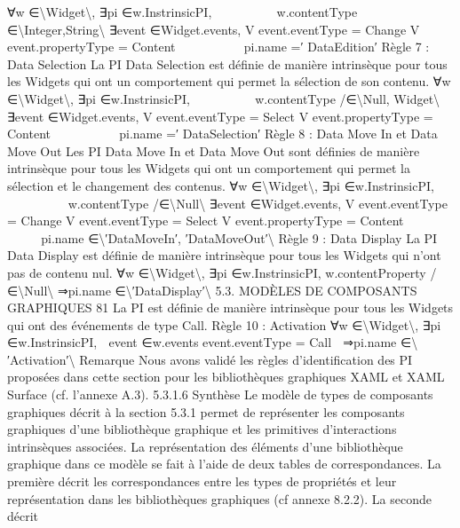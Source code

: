 \documentclass{article}
\begin{document}
∀w ∈\textbackslash{}{Widget\textbackslash{}}, ∃pi ∈w.InstrinsicPI,








w.contentType ∈\textbackslash{}{Integer,String\textbackslash{}}
∃event ∈Widget.events,
V
event.eventType = Change
V
event.propertyType = Content








⇒pi.name =′ DataEdition′
R\`{e}gle 7 : Data Selection
La PI Data Selection est d\'{e}ﬁnie de mani\`{e}re intrins\`{e}que pour tous les Widgets qui ont un comportement qui permet la s\'{e}lection de son contenu.
∀w ∈\textbackslash{}{Widget\textbackslash{}}, ∃pi ∈w.InstrinsicPI,








w.contentType /∈\textbackslash{}{Null, Widget\textbackslash{}}
∃event ∈Widget.events,
V
event.eventType = Select
V
event.propertyType = Content








⇒pi.name =′ DataSelection′
R\`{e}gle 8 : Data Move In et Data Move Out
Les PI Data Move In et Data Move Out sont d\'{e}ﬁnies de mani\`{e}re intrins\`{e}que pour tous les Widgets
qui ont un comportement qui permet la s\'{e}lection et le changement des contenus.
∀w ∈\textbackslash{}{Widget\textbackslash{}}, ∃pi ∈w.InstrinsicPI,










w.contentType /∈\textbackslash{}{Null\textbackslash{}}
∃event ∈Widget.events,
V
event.eventType = Change
V
event.eventType = Select V
event.propertyType = Content










⇒pi.name ∈\textbackslash{}{′DataMoveIn′, ′DataMoveOut′\textbackslash{}}
R\`{e}gle 9 : Data Display
La PI Data Display est d\'{e}ﬁnie de mani\`{e}re intrins\`{e}que pour tous les Widgets qui n’ont pas de
contenu nul.
∀w ∈\textbackslash{}{Widget\textbackslash{}}, ∃pi ∈w.InstrinsicPI,
w.contentProperty /∈\textbackslash{}{Null\textbackslash{}} ⇒pi.name ∈\textbackslash{}{′DataDisplay′\textbackslash{}}
5.3. MODÈLES DE COMPOSANTS GRAPHIQUES
81
La PI est d\'{e}ﬁnie de mani\`{e}re intrins\`{e}que pour tous les Widgets qui ont des \'{e}v\'{e}nements de type
Call.
R\`{e}gle 10 : Activation
∀w ∈\textbackslash{}{Widget\textbackslash{}}, ∃pi ∈w.InstrinsicPI,

event ∈w.events
event.eventType = Call

⇒pi.name ∈\textbackslash{}{′Activation′\textbackslash{}}
Remarque
Nous avons valid\'{e} les r\`{e}gles d’identiﬁcation des PI propos\'{e}es dans cette section pour
les biblioth\`{e}ques graphiques XAML et XAML Surface (cf. l’annexe A.3).
5.3.1.6
Synth\`{e}se
Le mod\`{e}le de types de composants graphiques d\'{e}crit \`{a} la section 5.3.1 permet de repr\'{e}senter les
composants graphiques d’une biblioth\`{e}que graphique et les primitives d’interactions intrins\`{e}ques associ\'{e}es. La repr\'{e}sentation des \'{e}l\'{e}ments d’une biblioth\`{e}que graphique dans ce mod\`{e}le se fait \`{a} l’aide
de deux tables de correspondances. La premi\`{e}re d\'{e}crit les correspondances entre les types de propri\'{e}t\'{e}s et leur repr\'{e}sentation dans les biblioth\`{e}ques graphiques (cf annexe 8.2.2). La seconde d\'{e}crit
\end{document}
